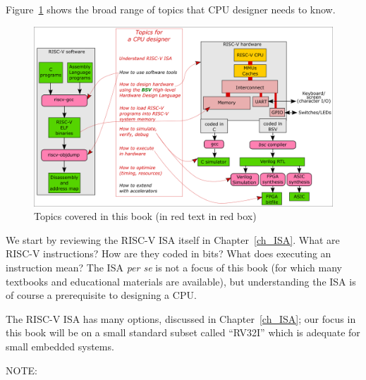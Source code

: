 Figure~\ref{Fig_Topics} shows the broad range of topics that CPU
designer needs to know.
\begin{figure}[htbp]
  \centerline{\includegraphics[width=6in,angle=0]{Figures/Fig_Topics}}
  \caption{\label{Fig_Topics}Topics covered in this book (in red text in red box)}
\end{figure}

We start by reviewing the RISC-V ISA itself in Chapter~\ref{ch_ISA}.
What are RISC-V instructions? How are they coded in bits? What does
executing an instruction mean?  The ISA \emph{per se} is not a focus
of this book (for which many textbooks and educational materials are
available), but understanding the ISA is of course a prerequisite to
designing a CPU.

The RISC-V ISA has many options, discussed in Chapter~\ref{ch_ISA};
our focus in this book will be on a small standard subset called
``RV32I'' which is adequate for small embedded systems.


\vspace{1ex}

NOTE: 

